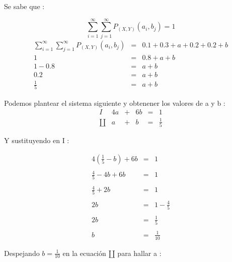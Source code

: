 \documentclass[12pt]{article}
\begin{document}
	Se sabe que :
	
	
	\begin{equation*}
		\sum_{i=1}^{\infty} \sum_{j=1}^{\infty}	P_{\left(X,Y\right)} \left(a_i,b_j\right) = 1    
	\end{equation*}
	\begin{equation*}
	\begin{array}{rcl}
		\sum_{i=1}^{\infty} \sum_{j=1}^{\infty}	P_{\left(X,Y\right)} \left(a_i,b_j\right) & = & 0.1 + 0.3 + a + 0.2 + 0.2 + b 
		\\
	        	1            & = & 0.8 + a + b 
	    \\
	         1 - 0.8         & = & a + b
	    \\
	           0.2           & = & a + b
	    \\
	      \frac{1}{5}        & = & a + b
		\end{array}  
	\end{equation*}

    Podemos plantear el sistema siguiente y obtenener los valores de a y b :
    \begin{equation*}
    \begin{array}{rccccl}
    I & 4a & + & 6b & = & 1 
    \\
    \amalg & a & + & b & = & \frac{1}{5}
    \end{array}
    \end{equation*}
    
    Y sustituyendo en I :
    
    \begin{equation*}
    \begin{array}{rcl}
    4(\frac{1}{5} - b)  +  6b & = & 1
    \\
    \\
    \frac{4}{5} - 4b  +  6b & = & 1
    \\ 
    \\
    \frac{4}{5}  +  2b & = & 1
    \\
    \\
    2b & = & 1  -  \frac{4}{5}
    \\
    \\
    2b & = & \frac{1}{5}
    \\
    \\
    b & = & \frac{1}{10}
    \end{array}    
    \end{equation*}
    
    
    Despejando $b = \frac{1}{10}$ en la ecuaci\'on $\amalg$ para hallar a :
    
\end{document}
